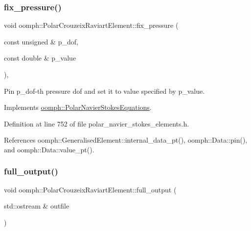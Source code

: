 \subsubsection{\texorpdfstring{fix\+\_\+pressure()}{fix\_pressure()}}
{\footnotesize\ttfamily void oomph\+::\+Polar\+Crouzeix\+Raviart\+Element\+::fix\+\_\+pressure (\begin{DoxyParamCaption}\item[{const unsigned \&}]{p\+\_\+dof,  }\item[{const double \&}]{p\+\_\+value }\end{DoxyParamCaption})\hspace{0.3cm}{\ttfamily [inline]}, {\ttfamily [virtual]}}



Pin p\+\_\+dof-\/th pressure dof and set it to value specified by p\+\_\+value. 



Implements \hyperlink{classoomph_1_1PolarNavierStokesEquations_a80333b602104b12993c7d3b242d2adfb}{oomph\+::\+Polar\+Navier\+Stokes\+Equations}.



Definition at line 752 of file polar\+\_\+navier\+\_\+stokes\+\_\+elements.\+h.



References oomph\+::\+Generalised\+Element\+::internal\+\_\+data\+\_\+pt(), oomph\+::\+Data\+::pin(), and oomph\+::\+Data\+::value\+\_\+pt().

\mbox{\label{classoomph_1_1PolarCrouzeixRaviartElement_afbc0b41da46fa27fa5cd35d9b38de2e1}} 
\subsubsection{\texorpdfstring{full\+\_\+output()}{full\_output()}\hspace{0.1cm}{\footnotesize\ttfamily [1/2]}}
{\footnotesize\ttfamily void oomph\+::\+Polar\+Crouzeix\+Raviart\+Element\+::full\+\_\+output (\begin{DoxyParamCaption}\item[{std\+::ostream \&}]{outfile }\end{DoxyParamCaption})\hspace{0.3cm}{\ttfamily [inline]}}



